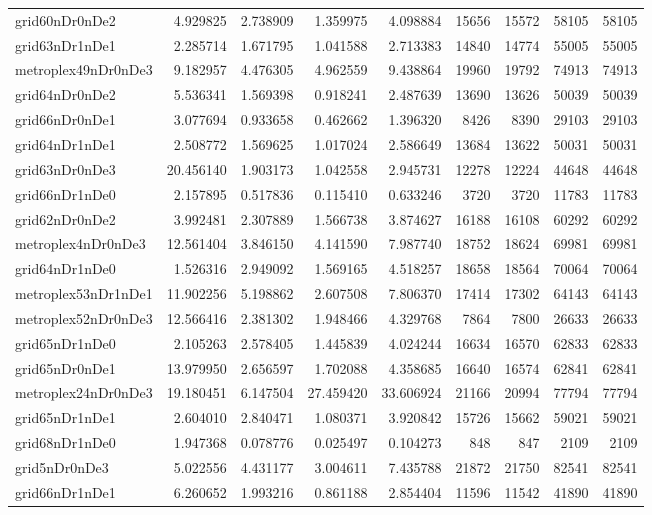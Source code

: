 \begin{longtable}{|l|r|r|r|r|r|r|r|r|}
grid60nDr0nDe2 & 4.929825 & 2.738909 & 1.359975 & 4.098884 & 15656 & 15572 & 58105 & 58105 \\
grid63nDr1nDe1 & 2.285714 & 1.671795 & 1.041588 & 2.713383 & 14840 & 14774 & 55005 & 55005 \\
metroplex49nDr0nDe3 & 9.182957 & 4.476305 & 4.962559 & 9.438864 & 19960 & 19792 & 74913 & 74913 \\
grid64nDr0nDe2 & 5.536341 & 1.569398 & 0.918241 & 2.487639 & 13690 & 13626 & 50039 & 50039 \\
grid66nDr0nDe1 & 3.077694 & 0.933658 & 0.462662 & 1.396320 & 8426 & 8390 & 29103 & 29103 \\
grid64nDr1nDe1 & 2.508772 & 1.569625 & 1.017024 & 2.586649 & 13684 & 13622 & 50031 & 50031 \\
grid63nDr0nDe3 & 20.456140 & 1.903173 & 1.042558 & 2.945731 & 12278 & 12224 & 44648 & 44648 \\
grid66nDr1nDe0 & 2.157895 & 0.517836 & 0.115410 & 0.633246 & 3720 & 3720 & 11783 & 11783 \\
grid62nDr0nDe2 & 3.992481 & 2.307889 & 1.566738 & 3.874627 & 16188 & 16108 & 60292 & 60292 \\
metroplex4nDr0nDe3 & 12.561404 & 3.846150 & 4.141590 & 7.987740 & 18752 & 18624 & 69981 & 69981 \\
grid64nDr1nDe0 & 1.526316 & 2.949092 & 1.569165 & 4.518257 & 18658 & 18564 & 70064 & 70064 \\
metroplex53nDr1nDe1 & 11.902256 & 5.198862 & 2.607508 & 7.806370 & 17414 & 17302 & 64143 & 64143 \\
metroplex52nDr0nDe3 & 12.566416 & 2.381302 & 1.948466 & 4.329768 & 7864 & 7800 & 26633 & 26633 \\
grid65nDr1nDe0 & 2.105263 & 2.578405 & 1.445839 & 4.024244 & 16634 & 16570 & 62833 & 62833 \\
grid65nDr0nDe1 & 13.979950 & 2.656597 & 1.702088 & 4.358685 & 16640 & 16574 & 62841 & 62841 \\
metroplex24nDr0nDe3 & 19.180451 & 6.147504 & 27.459420 & 33.606924 & 21166 & 20994 & 77794 & 77794 \\
grid65nDr1nDe1 & 2.604010 & 2.840471 & 1.080371 & 3.920842 & 15726 & 15662 & 59021 & 59021 \\
grid68nDr1nDe0 & 1.947368 & 0.078776 & 0.025497 & 0.104273 & 848 & 847 & 2109 & 2109 \\
grid5nDr0nDe3 & 5.022556 & 4.431177 & 3.004611 & 7.435788 & 21872 & 21750 & 82541 & 82541 \\
grid66nDr1nDe1 & 6.260652 & 1.993216 & 0.861188 & 2.854404 & 11596 & 11542 & 41890 & 41890 \\

\end{longtable}
